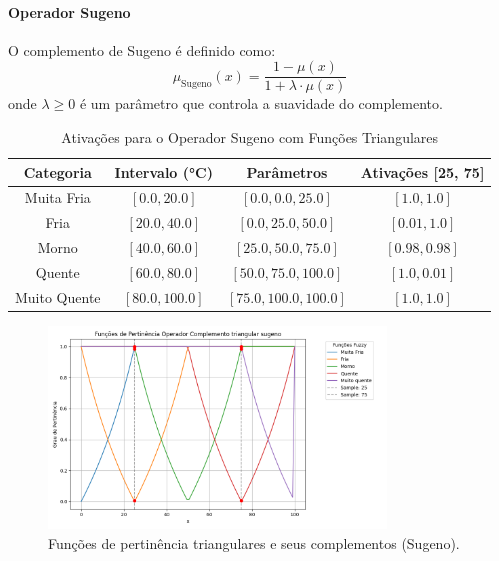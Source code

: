 \documentclass[a4paper,12pt]{article}
\begin{document}
\paragraph{Operador Sugeno}

O complemento de Sugeno é definido como:
\[
\mu_{\text{Sugeno}}(x) = \frac{1 - \mu(x)}{1 + \lambda \cdot \mu(x)}
\]
onde $\lambda \geq 0$ é um parâmetro que controla a suavidade do complemento.
\begin{table}[H]
\centering
\caption{Ativações para o Operador Sugeno com Funções Triangulares}
\begin{tabular}{|c|c|c|c|}
\hline
\textbf{Categoria}    & \textbf{Intervalo (°C)} & \textbf{Parâmetros}       & \textbf{Ativações [25, 75]} \\ \hline
Muita Fria            & $[0.0, 20.0]$          & $[0.0, 0.0, 25.0]$        & $[1.0, 1.0]$               \\ \hline
Fria                  & $[20.0, 40.0]$         & $[0.0, 25.0, 50.0]$       & $[0.01, 1.0]$              \\ \hline
Morno                 & $[40.0, 60.0]$         & $[25.0, 50.0, 75.0]$      & $[0.98, 0.98]$             \\ \hline
Quente                & $[60.0, 80.0]$         & $[50.0, 75.0, 100.0]$     & $[1.0, 0.01]$              \\ \hline
Muito Quente          & $[80.0, 100.0]$        & $[75.0, 100.0, 100.0]$    & $[1.0, 1.0]$               \\ \hline
\end{tabular}
\end{table}

\begin{figure}[H]
    \centering
    \includegraphics[width=0.8\textwidth]{img/funções_de_pertinência_operador_complemento_triangular_sugeno_fuzzificado.png}
    \caption{Funções de pertinência triangulares e seus complementos (Sugeno).}
    \label{fig:complemento_sugeno_triangular}
\end{figure}
\end{document}
